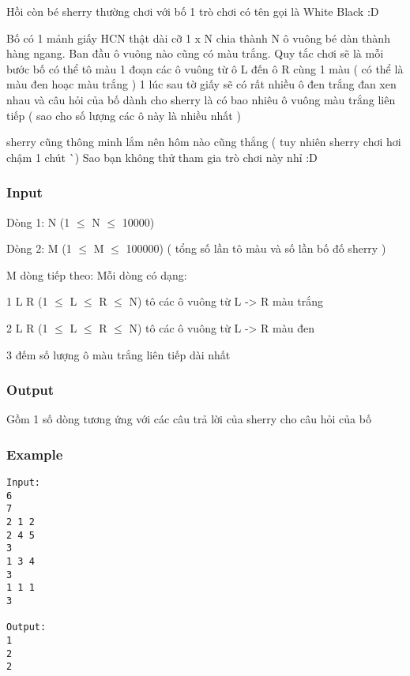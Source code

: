 



   Hồi còn bé sherry thường chơi với bố 1 trò chơi có tên gọi là White Black :D  

   Bố có 1 mảnh giấy HCN thật dài cỡ 1 x N chia thành N ô vuông bé dàn thành hàng ngang. Ban đầu ô vuông nào cũng có màu trắng. Quy tắc chơi sẽ là mỗi bước bố có thể tô màu 1 đoạn các ô vuông từ ô L đến ô R cùng 1 màu ( có thể là màu đen hoạc màu trắng ) 1 lúc sau tờ giấy sẽ có rất nhiều ô đen trắng đan xen nhau và câu hỏi của bố dành cho sherry là có bao nhiêu ô vuông màu trắng liên tiếp ( sao cho số lượng các ô này là nhiều nhất )  

   sherry cũng thông minh lắm nên hôm nào cũng thắng ( tuy nhiên sherry chơi hơi chậm 1 chút ^^ ) Sao bạn không thử tham gia trò chơi này nhỉ :D  

\subsubsection{   Input  }

   Dòng 1: N (1  $\le$  N  $\le$  10000)  

   Dòng 2: M (1  $\le$  M  $\le$  100000) ( tổng số lần tô màu và số lần bố đố sherry )  

   M dòng tiếp theo: Mỗi dòng có dạng:  

   1  L  R  (1  $\le$  L  $\le$  R  $\le$  N) tô các ô vuông từ L -> R màu trắng  

   2  L  R  (1  $\le$  L  $\le$  R  $\le$  N) tô các ô vuông từ L -> R màu đen  

   3 đếm số lượng ô màu trắng liên tiếp dài nhất  

\subsubsection{   Output  }

   Gồm 1 số dòng tương ứng với các câu trả lời của sherry cho câu hỏi của bố  

\subsubsection{   Example  }
\begin{verbatim}
Input:
6
7
2 1 2
2 4 5
3
1 3 4
3
1 1 1
3

Output:
1
2
2
\end{verbatim}
